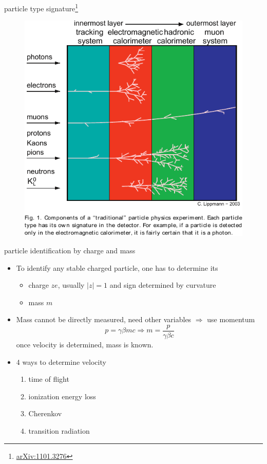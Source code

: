 \documentclass{beamer}
\begin{document}
\begin{frame}{particle type signature\footnote{\href{http://arxiv.org/abs/1101.3276}{arXiv:1101.3276}}}
\begin{figure}
	\includegraphics[height=.8\textheight]{plots/particle_signature.pdf}
\end{figure}
\end{frame}


\begin{frame}{particle identification by charge and mass}
\begin{itemize}
\item To identify any stable charged particle, one has to determine its
  \begin{itemize}
  \item charge $ze$, usually $|z|=1$ and sign determined by curvature
  \item mass $m$
  \end{itemize}
\item Mass cannot be directly measured, need other variables $\Rightarrow$ use momentum
\begin{equation}
p=\gamma\beta mc\Longrightarrow m=\frac{p}{\gamma\beta c}
\end{equation}
once velocity is determined, mass is known.
\item 4 ways to determine velocity
  \begin{enumerate}
  \item time of flight
  \item ionization energy loss
  \item Cherenkov
  \item transition radiation
  \end{enumerate}
\end{itemize}
\end{frame}
\end{document}
